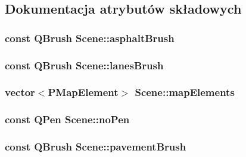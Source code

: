 \subsection{Dokumentacja atrybutów składowych}
\hypertarget{class_scene_a61809011ee96172d42280dd9aa1c0846}{
\subsubsection[{asphalt\-Brush}]{\setlength{\rightskip}{0pt plus 5cm}const Q\-Brush Scene\-::asphalt\-Brush\hspace{0.3cm}{\ttfamily [protected]}}}\label{class_scene_a61809011ee96172d42280dd9aa1c0846}
\hypertarget{class_scene_a3cc532bd0e9e328041509d829d58f50d}{
\subsubsection[{lanes\-Brush}]{\setlength{\rightskip}{0pt plus 5cm}const Q\-Brush Scene\-::lanes\-Brush\hspace{0.3cm}{\ttfamily [protected]}}}\label{class_scene_a3cc532bd0e9e328041509d829d58f50d}
\hypertarget{class_scene_a209cfc1d4f90fb58093a3db2fad23e08}{
\subsubsection[{map\-Elements}]{\setlength{\rightskip}{0pt plus 5cm}vector$<${\bf P\-Map\-Element}$>$ Scene\-::map\-Elements\hspace{0.3cm}{\ttfamily [protected]}}}\label{class_scene_a209cfc1d4f90fb58093a3db2fad23e08}
\hypertarget{class_scene_a310ffbaf94652c71e44c3576caa2bd99}{
\subsubsection[{no\-Pen}]{\setlength{\rightskip}{0pt plus 5cm}const Q\-Pen Scene\-::no\-Pen\hspace{0.3cm}{\ttfamily [protected]}}}\label{class_scene_a310ffbaf94652c71e44c3576caa2bd99}
\hypertarget{class_scene_aa07495f36b834636c73de85b6f8143f9}{
\subsubsection[{pavement\-Brush}]{\setlength{\rightskip}{0pt plus 5cm}const Q\-Brush Scene\-::pavement\-Brush\hspace{0.3cm}{\ttfamily [protected]}}}\label{class_scene_aa07495f36b834636c73de85b6f8143f9}
